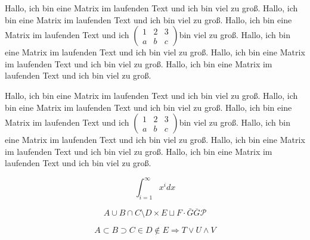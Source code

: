 \documentclass[12pt,ngerman,parskip=full]{scrartcl}
\begin{document}
Hallo, ich bin eine Matrix im laufenden Text und ich bin viel zu groß. Hallo, ich bin eine Matrix im laufenden Text und ich bin viel zu groß. Hallo, ich bin eine Matrix im laufenden Text und ich 
\(	(\begin{smallmatrix}
	1 & 2 & 3\\
	a & b & c
\end{smallmatrix})
\)bin viel zu groß. Hallo, ich bin eine Matrix im laufenden Text und ich bin viel zu groß. Hallo, ich bin eine Matrix im laufenden Text und ich bin viel zu groß. Hallo, ich bin eine Matrix im laufenden Text und ich bin viel zu groß. 

Hallo, ich bin eine Matrix im laufenden Text und ich bin viel zu groß. Hallo, ich bin eine Matrix im laufenden Text und ich bin viel zu groß. Hallo, ich bin eine Matrix im laufenden Text und ich 
\(	\left(\begin{smallmatrix}
	1 & 2 & 3\\
	a & b & c
\end{smallmatrix}\right) 
\)bin viel zu groß. Hallo, ich bin eine Matrix im laufenden Text und ich bin viel zu groß. Hallo, ich bin eine Matrix im laufenden Text und ich bin viel zu groß. Hallo, ich bin eine Matrix im laufenden Text und ich bin viel zu groß. 

\begin{equation}
\int_{i=1}^{\infty} x^i dx
\end{equation}

\begin{equation}
A \cup B \cap C \setminus D  \times E \sqcup F \cdot \bar{G} \overline{G}  \mathcal{P} 
\end{equation}

\begin{equation}
	A \subset B \supset C \in D \notin E \Rightarrow T \lor U \land V
\end{equation}

\end{document}
